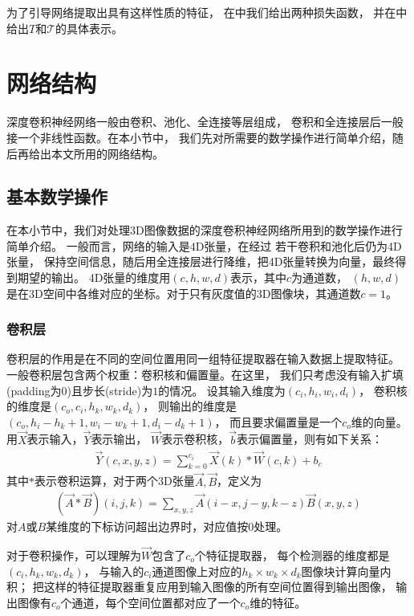 为了引导网络提取出具有这样性质的特征，
在中我们给出两种损失函数，
并在中给出$T$和$\mathcal{T}$的具体表示。



\section{网络结构}
深度卷积神经网络一般由卷积、池化、全连接等层组成，
卷积和全连接层后一般接一个非线性函数。在本小节中，
我们先对所需要的数学操作进行简单介绍，随后再给出本文所用的网络结构。

\subsection{基本数学操作}
在本小节中，我们对处理3D图像数据的深度卷积神经网络所用到的数学操作进行简单介绍。
一般而言，网络的输入是4D张量，在经过 若干卷积和池化后仍为4D张量，
保持空间信息，随后用全连接层进行降维，把4D张量转换为向量，最终得到期望的输出。
4D张量的维度用$(c, h, w, d)$表示，其中$c$为通道数，
$(h, w, d)$是在3D空间中各维对应的坐标。对于只有灰度值的3D图像块，其通道数$c=1$。


\subsubsection{卷积层}
卷积层的作用是在不同的空间位置用同一组特征提取器在输入数据上提取特征。
一般卷积层包含两个权重：卷积核和偏置量。在这里，
我们只考虑没有输入扩填(padding为0)且步长(stride)为$1$的情况。
设其输入维度为$(c_i, h_i, w_i, d_i)$，
卷积核的维度是$(c_o, c_i, h_k, w_k, d_k)$，
则输出的维度是$(c_o, h_i - h_k + 1, w_i - w_k + 1, d_i - d_k + 1)$，
而且要求偏置量是一个$c_o$维的向量。用$\vec{X}$表示输入，$\vec{Y}$表示输出，
$\vec{W}$表示卷积核，$\vec{b}$表示偏置量，则有如下关系：
\begin{eqnarray}
    \vec{Y}(c, x, y, z) = \sum_{k=0}^{c_i} \vec{X}(k) * \vec{W}(c, k) + b_c
\end{eqnarray}
其中$*$表示卷积运算，对于两个3D张量$\vec{A}, \vec{B}$，定义为
\begin{eqnarray}
    (\vec{A} * \vec{B})(i, j, k) = \sum_{x, y, z}\vec{A}(i-x, j-y, k-z)
        \vec{B}(x,y,z)
\end{eqnarray}
对$A$或$B$某维度的下标访问超出边界时，对应值按$0$处理。

对于卷积操作，可以理解为$\vec{W}$包含了$c_o$个特征提取器，
每个检测器的维度都是$(c_i, h_k, w_k, d_k)$，
与输入的$c_i$通道图像上对应的$h_k \times w_k \times d_k$图像块计算向量内积；
把这样的特征提取器重复应用到输入图像的所有空间位置得到输出图像，
输出图像有$c_o$个通道，每个空间位置都对应了一个$c_o$维的特征。


